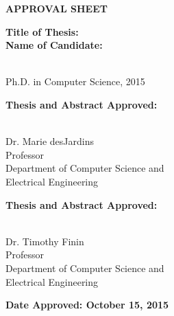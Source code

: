 \newpage
\begin{titlepage}
\vspace{0.6in}
\begin{singlespace}

\begin{center}
\vspace{0.1in}
\large{\bf APPROVAL SHEET}
\bigskip \bigskip
\end{center}

\begin{flushleft}
{\bf Title of Thesis:}{\hspace{3mm}}\thesistitle{}\\
\vspace{0.5in}
{\bf Name of Candidate:}{\hspace{3mm}} \parbox[t]{2in}{\fullname{} \\ Ph.D. in Computer Science, 2015}
\end{flushleft}

\vspace{0.5in}

\begin{flushleft}
{\bf Thesis and Abstract Approved:}{\hspace{3mm}} 
\parbox[t]{2.5in}{\underline{\hspace{2.0in}}\\ 
	Dr. Marie desJardins \\
	Professor \\
	Department of Computer Science and \\
	Electrical Engineering}
\end{flushleft}

\vspace{0.5in}

\begin{flushleft}
{\bf Thesis and Abstract Approved:}{\hspace{3mm}} 
\parbox[t]{2.5in}{\underline{\hspace{2.0in}}\\ 
	Dr. Timothy Finin \\
	Professor \\
	Department of Computer Science and \\
	Electrical Engineering}
\end{flushleft}

\vspace{0.8in}

\begin{flushleft}
{\bf Date Approved: October 15, 2015}{\hspace{3mm}} \underline{\hspace{2.5in}}\\
\end{flushleft}

\end{singlespace}
\end{titlepage}
\par\vfil
